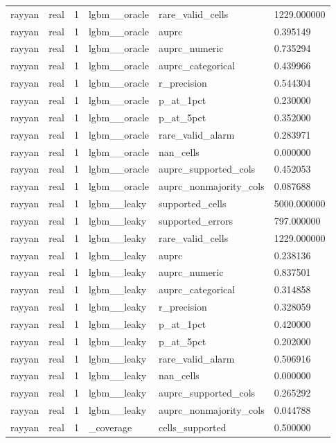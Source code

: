 \begin{tabular}{llllll}
rayyan & real & 1 & lgbm\_\_oracle & rare\_valid\_cells & 1229.000000 \\
rayyan & real & 1 & lgbm\_\_oracle & auprc & 0.395149 \\
rayyan & real & 1 & lgbm\_\_oracle & auprc\_numeric & 0.735294 \\
rayyan & real & 1 & lgbm\_\_oracle & auprc\_categorical & 0.439966 \\
rayyan & real & 1 & lgbm\_\_oracle & r\_precision & 0.544304 \\
rayyan & real & 1 & lgbm\_\_oracle & p\_at\_1pct & 0.230000 \\
rayyan & real & 1 & lgbm\_\_oracle & p\_at\_5pct & 0.352000 \\
rayyan & real & 1 & lgbm\_\_oracle & rare\_valid\_alarm & 0.283971 \\
rayyan & real & 1 & lgbm\_\_oracle & nan\_cells & 0.000000 \\
rayyan & real & 1 & lgbm\_\_oracle & auprc\_supported\_cols & 0.452053 \\
rayyan & real & 1 & lgbm\_\_oracle & auprc\_nonmajority\_cols & 0.087688 \\
rayyan & real & 1 & lgbm\_\_leaky & supported\_cells & 5000.000000 \\
rayyan & real & 1 & lgbm\_\_leaky & supported\_errors & 797.000000 \\
rayyan & real & 1 & lgbm\_\_leaky & rare\_valid\_cells & 1229.000000 \\
rayyan & real & 1 & lgbm\_\_leaky & auprc & 0.238136 \\
rayyan & real & 1 & lgbm\_\_leaky & auprc\_numeric & 0.837501 \\
rayyan & real & 1 & lgbm\_\_leaky & auprc\_categorical & 0.314858 \\
rayyan & real & 1 & lgbm\_\_leaky & r\_precision & 0.328059 \\
rayyan & real & 1 & lgbm\_\_leaky & p\_at\_1pct & 0.420000 \\
rayyan & real & 1 & lgbm\_\_leaky & p\_at\_5pct & 0.202000 \\
rayyan & real & 1 & lgbm\_\_leaky & rare\_valid\_alarm & 0.506916 \\
rayyan & real & 1 & lgbm\_\_leaky & nan\_cells & 0.000000 \\
rayyan & real & 1 & lgbm\_\_leaky & auprc\_supported\_cols & 0.265292 \\
rayyan & real & 1 & lgbm\_\_leaky & auprc\_nonmajority\_cols & 0.044788 \\
rayyan & real & 1 & \_coverage & cells\_supported & 0.500000 \\

\end{tabular}
